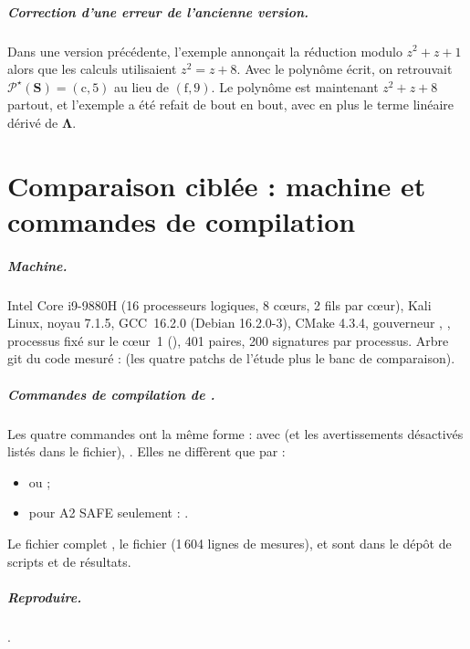 \paragraph{Correction d'une erreur de l'ancienne version.} Dans une version précédente, l'exemple annonçait la réduction modulo $z^2+z+1$ alors que les calculs utilisaient $z^2=z+8$. Avec le polynôme écrit, on retrouvait $\mathcal{P}^\star(\mathbf{S})=(\mathrm{c},5)$ au lieu de $(\mathrm{f},9)$. Le polynôme est maintenant $z^2+z+8$ partout, et l'exemple a été refait de bout en bout, avec en plus le terme linéaire dérivé de $\boldsymbol{\Lambda}$.

\chapter{Comparaison ciblée : machine et commandes de compilation}\label{app:iso}
\paragraph{Machine.} Intel Core i9-9880H (16 processeurs logiques, 8 c\oe urs, 2 fils par c\oe ur), Kali Linux, noyau 7.1.5, GCC~16.2.0 (Debian 16.2.0-3), CMake 4.3.4, gouverneur , , processus fixé sur le c\oe ur~1 (), 401 paires, 200 signatures par processus. Arbre git du code mesuré :  (les quatre patchs de l'étude plus le banc de comparaison).
\paragraph{Commandes de compilation de .} Les quatre commandes ont la même forme :  avec  (et les avertissements désactivés listés dans le fichier), . Elles ne diffèrent que par :
\begin{itemize}
\item {} ou  ;
\item pour A2 SAFE seulement : .
\end{itemize}
Le fichier complet , le fichier  (1\,604 lignes de mesures),  et  sont dans le dépôt de scripts et de résultats.
\paragraph{Reproduire.} .
